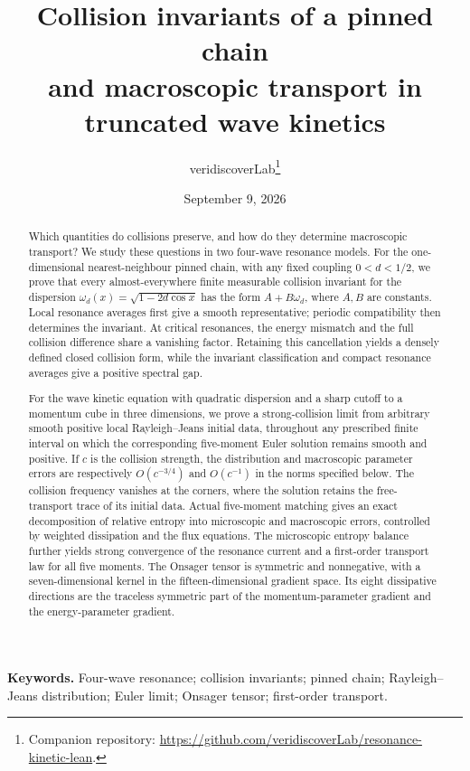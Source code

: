 \documentclass[11pt,a4paper]{article}
\title{\bfseries Collision invariants of a pinned chain\\
and macroscopic transport in truncated wave kinetics}
\author{veridiscoverLab\thanks{Companion repository:
\url{https://github.com/veridiscoverLab/resonance-kinetic-lean}.}}
\date{September 9, 2026}
\numberwithin{equation}{section}
\theoremstyle{plain}
\theoremstyle{definition}
\theoremstyle{remark}
\begin{document}
\maketitle
\begin{abstract}
Which quantities do collisions preserve, and how do they determine macroscopic
transport? We study these questions in two four-wave resonance models.
For the one-dimensional nearest-neighbour pinned chain, with any fixed coupling
$0<d<1/2$, we prove that every almost-everywhere finite measurable collision
invariant for the dispersion $\omega_d(x)=\sqrt{1-2d\cos x}$ has the form
$A+B\omega_d$, where $A,B$ are constants. Local resonance averages first give a
smooth representative; periodic compatibility then determines the invariant.
At critical resonances, the energy mismatch and the full collision difference
share a vanishing factor. Retaining this cancellation yields a densely defined
closed collision form, while the invariant classification and compact resonance
averages give a positive spectral gap.

For the wave kinetic equation with quadratic dispersion and a sharp cutoff
to a momentum cube in three dimensions, we prove a strong-collision limit from
arbitrary smooth positive local Rayleigh--Jeans initial data, throughout any
prescribed finite interval on which the corresponding five-moment Euler solution
remains smooth and positive. If $c$ is the collision strength, the distribution
and macroscopic parameter errors are respectively $O(c^{-3/4})$ and $O(c^{-1})$
in the norms specified below. The collision frequency vanishes at the corners,
where the solution retains the free-transport trace of its initial data.
Actual five-moment matching gives an exact decomposition of relative entropy
into microscopic and macroscopic errors, controlled by weighted dissipation
and the flux equations. The microscopic entropy balance further yields strong
convergence of the resonance current and a first-order transport law for all
five moments. The Onsager tensor is symmetric and nonnegative, with a
seven-dimensional kernel in the fifteen-dimensional gradient space. Its eight
dissipative directions are the traceless symmetric part of the momentum-parameter
gradient and the energy-parameter gradient.
\end{abstract}
\noindent\textbf{Keywords.} Four-wave resonance; collision invariants; pinned chain;
Rayleigh--Jeans distribution; Euler limit; Onsager tensor; first-order transport.


\clearpage
\begingroup
\small
\setlength{\parskip}{0pt}
\setcounter{tocdepth}{2}
\tableofcontents
\endgroup
\clearpage






\clearpage

\clearpage

\end{document}
